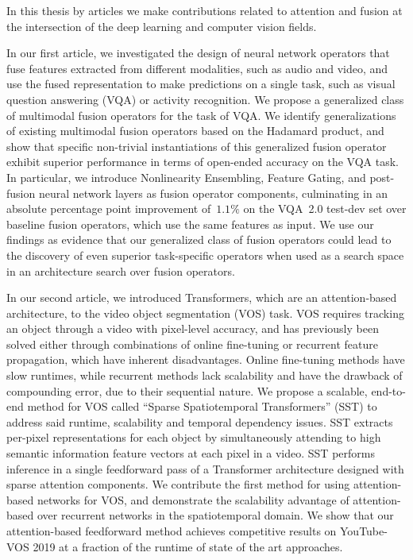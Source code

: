 In this thesis by articles we make contributions related to attention and
fusion at the intersection of the deep learning and computer vision fields.

In our first article, we investigated the design of neural network operators
that fuse features extracted from different modalities, such as audio and
video, and use the fused representation to make predictions on a single task,
such as visual question answering (VQA) or activity recognition.
We propose a generalized class of multimodal fusion operators for the task of
VQA.
We identify generalizations of existing multimodal fusion operators based on
the Hadamard product, and show that specific non-trivial instantiations of this
generalized fusion operator exhibit superior performance in terms of open-ended
accuracy on the VQA task.
In particular, we introduce Nonlinearity Ensembling, Feature Gating, and
post-fusion neural network layers as fusion operator components, culminating in
an absolute percentage point improvement of~$1.1\%$ on the VQA~2.0 test-dev set
over baseline fusion operators, which use the same features as input.
We use our findings as evidence that our generalized class of fusion operators
could lead to the discovery of even superior task-specific operators when used
as a search space in an architecture search over fusion operators.

In our second article, we introduced Transformers, which are an attention-based
architecture, to the video object segmentation (VOS) task.
VOS requires tracking an object through a video
with pixel-level accuracy, and has previously been solved either through
combinations of online fine-tuning or recurrent feature propagation, which have
inherent disadvantages.
Online fine-tuning methods have slow runtimes, while recurrent methods lack
scalability and have the drawback of compounding error, due to their sequential
nature.
We propose a scalable, end-to-end method for VOS called
``Sparse Spatiotemporal Transformers'' (SST) to address said runtime,
scalability and temporal dependency issues.
SST extracts per-pixel representations for each object by simultaneously
attending to high semantic information feature vectors at each pixel in a
video.
SST performs inference in a single feedforward pass of a Transformer
architecture designed with sparse attention components.
We contribute the first method for using attention-based networks for VOS, and
demonstrate the scalability advantage of attention-based over recurrent
networks in the spatiotemporal domain.
We show that our attention-based feedforward method achieves competitive
results on YouTube-VOS 2019 at a fraction of the runtime of state of the art
approaches.
